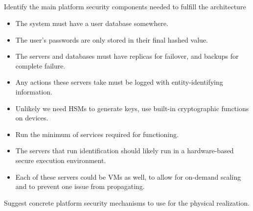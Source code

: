 \begin{questions}
\begin{parts}
  \part{} Identify the main platform security components needed to fulfill the architecture
    \begin{solution}
      \begin{itemize}[noitemsep]
      \item The system must have a user database somewhere.
      \item The user's passwords are only stored in their final hashed value.
      \item The servers and databases must have replicas for failover, and backups for complete failure.
      \item Any actions these servers take must be logged with entity-identifying information.
      \item Unlikely we need HSMs to generate keys, use built-in cryptographic functions on devices.
      \item Run the minimum of services required for functioning.
      \item The servers that run identification should likely run in a hardware-based secure execution environment.
      \item Each of these servers could be VMs as well, to allow for on-demand scaling and to prevent one issue from propagating.
      \end{itemize}
    \end{solution}

    \begin{subparts}
    \subpart{} Suggest concrete platform security mechanisms to use for the physical realization.
    \end{subparts}
  \end{parts}
\end{questions}

